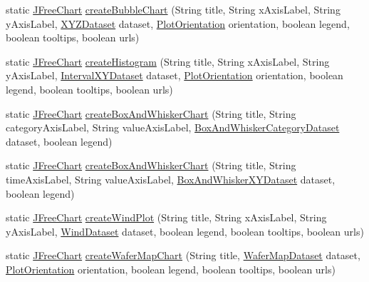 \begin{DoxyCompactItemize}
\item 
static \mbox{\hyperlink{classorg_1_1jfree_1_1chart_1_1_j_free_chart}{J\+Free\+Chart}} \mbox{\hyperlink{classorg_1_1jfree_1_1chart_1_1_chart_factory_a8dea17ce39c696eeab508b468c5b0f85}{create\+Bubble\+Chart}} (String title, String x\+Axis\+Label, String y\+Axis\+Label, \mbox{\hyperlink{interfaceorg_1_1jfree_1_1data_1_1xy_1_1_x_y_z_dataset}{X\+Y\+Z\+Dataset}} dataset, \mbox{\hyperlink{classorg_1_1jfree_1_1chart_1_1plot_1_1_plot_orientation}{Plot\+Orientation}} orientation, boolean legend, boolean tooltips, boolean urls)
\item 
static \mbox{\hyperlink{classorg_1_1jfree_1_1chart_1_1_j_free_chart}{J\+Free\+Chart}} \mbox{\hyperlink{classorg_1_1jfree_1_1chart_1_1_chart_factory_a5f4858431d868f19358870c6529d0b04}{create\+Histogram}} (String title, String x\+Axis\+Label, String y\+Axis\+Label, \mbox{\hyperlink{interfaceorg_1_1jfree_1_1data_1_1xy_1_1_interval_x_y_dataset}{Interval\+X\+Y\+Dataset}} dataset, \mbox{\hyperlink{classorg_1_1jfree_1_1chart_1_1plot_1_1_plot_orientation}{Plot\+Orientation}} orientation, boolean legend, boolean tooltips, boolean urls)
\item 
static \mbox{\hyperlink{classorg_1_1jfree_1_1chart_1_1_j_free_chart}{J\+Free\+Chart}} \mbox{\hyperlink{classorg_1_1jfree_1_1chart_1_1_chart_factory_a54b3a00c82810be28851653d79e21608}{create\+Box\+And\+Whisker\+Chart}} (String title, String category\+Axis\+Label, String value\+Axis\+Label, \mbox{\hyperlink{interfaceorg_1_1jfree_1_1data_1_1statistics_1_1_box_and_whisker_category_dataset}{Box\+And\+Whisker\+Category\+Dataset}} dataset, boolean legend)
\item 
static \mbox{\hyperlink{classorg_1_1jfree_1_1chart_1_1_j_free_chart}{J\+Free\+Chart}} \mbox{\hyperlink{classorg_1_1jfree_1_1chart_1_1_chart_factory_a36d1efae29cc84b339bf0f0237c2f1d5}{create\+Box\+And\+Whisker\+Chart}} (String title, String time\+Axis\+Label, String value\+Axis\+Label, \mbox{\hyperlink{interfaceorg_1_1jfree_1_1data_1_1statistics_1_1_box_and_whisker_x_y_dataset}{Box\+And\+Whisker\+X\+Y\+Dataset}} dataset, boolean legend)
\item 
static \mbox{\hyperlink{classorg_1_1jfree_1_1chart_1_1_j_free_chart}{J\+Free\+Chart}} \mbox{\hyperlink{classorg_1_1jfree_1_1chart_1_1_chart_factory_a1be25faad4e8a36203506f2d89bff92a}{create\+Wind\+Plot}} (String title, String x\+Axis\+Label, String y\+Axis\+Label, \mbox{\hyperlink{interfaceorg_1_1jfree_1_1data_1_1xy_1_1_wind_dataset}{Wind\+Dataset}} dataset, boolean legend, boolean tooltips, boolean urls)
\item 
static \mbox{\hyperlink{classorg_1_1jfree_1_1chart_1_1_j_free_chart}{J\+Free\+Chart}} \mbox{\hyperlink{classorg_1_1jfree_1_1chart_1_1_chart_factory_a799da5a03dd680d19c1c4a9f8784c09e}{create\+Wafer\+Map\+Chart}} (String title, \mbox{\hyperlink{classorg_1_1jfree_1_1data_1_1general_1_1_wafer_map_dataset}{Wafer\+Map\+Dataset}} dataset, \mbox{\hyperlink{classorg_1_1jfree_1_1chart_1_1plot_1_1_plot_orientation}{Plot\+Orientation}} orientation, boolean legend, boolean tooltips, boolean urls)
\end{DoxyCompactItemize}


